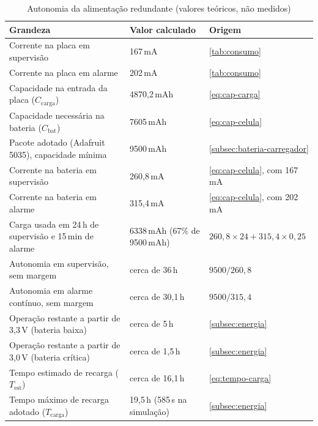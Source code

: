 \begin{table}[H]
\centering
\caption{Autonomia da alimentação redundante (valores teóricos, não medidos)}
\label{tab:autonomia}
\small
\begin{tabular}{p{7.0cm}p{3.2cm}p{3.8cm}}
\hline
\textbf{Grandeza} & \textbf{Valor calculado} & \textbf{Origem} \\
\hline
Corrente na placa em supervisão & 167\,mA & \autoref{tab:consumo} \\
Corrente na placa em alarme & 202\,mA & \autoref{tab:consumo} \\
Capacidade na entrada da placa ($C_{\mathrm{carga}}$) & 4870,2\,mAh & \autoref{eq:cap-carga} \\
Capacidade necessária na bateria ($C_{\mathrm{bat}}$) & 7605\,mAh & \autoref{eq:cap-celula} \\
Pacote adotado (Adafruit 5035), capacidade mínima & 9500\,mAh & \autoref{subsec:bateria-carregador} \\
Corrente na bateria em supervisão & 260,8\,mA & \autoref{eq:cap-celula}, com 167\,mA \\
Corrente na bateria em alarme & 315,4\,mA & \autoref{eq:cap-celula}, com 202\,mA \\
Carga usada em 24\,h de supervisão e 15\,min de alarme & 6338\,mAh (67\% de 9500\,mAh) & $260{,}8 \times 24 + 315{,}4 \times 0{,}25$ \\
Autonomia em supervisão, sem margem & cerca de 36\,h & $9500 / 260{,}8$ \\
Autonomia em alarme contínuo, sem margem & cerca de 30,1\,h & $9500 / 315{,}4$ \\
Operação restante a partir de 3,3\,V (bateria baixa) & cerca de 5\,h & \autoref{subsec:energia} \\
Operação restante a partir de 3,0\,V (bateria crítica) & cerca de 1,5\,h & \autoref{subsec:energia} \\
Tempo estimado de recarga ($T_{\mathrm{est}}$) & cerca de 16,1\,h & \autoref{eq:tempo-carga} \\
Tempo máximo de recarga adotado ($T_{\mathrm{carga}}$) & 19,5\,h (585\,s na simulação) & \autoref{subsec:energia} \\
\hline
\end{tabular}
\end{table}

